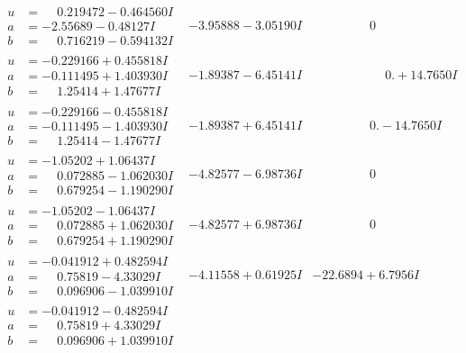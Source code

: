 \documentclass[1p]{elsarticle_modified}
\theoremstyle{definition}
\begin{document}
$$\begin{array}{c|c|c}
\begin{aligned}
u &= \phantom{-}0.219472 - 0.464560 I \\
a &= -2.55689 - 0.48127 I \\
b &= \phantom{-}0.716219 - 0.594132 I\end{aligned}
 & -3.95888 - 3.05190 I & \phantom{-0.000000 } 0 \\ \hline\begin{aligned}
u &= -0.229166 + 0.455818 I \\
a &= -0.111495 + 1.403930 I \\
b &= \phantom{-}1.25414 + 1.47677 I\end{aligned}
 & -1.89387 - 6.45141 I & \phantom{-0.000000 -}0. + 14.7650 I \\ \hline\begin{aligned}
u &= -0.229166 - 0.455818 I \\
a &= -0.111495 - 1.403930 I \\
b &= \phantom{-}1.25414 - 1.47677 I\end{aligned}
 & -1.89387 + 6.45141 I & \phantom{-0.000000 } 0. - 14.7650 I \\ \hline\begin{aligned}
u &= -1.05202 + 1.06437 I \\
a &= \phantom{-}0.072885 - 1.062030 I \\
b &= \phantom{-}0.679254 - 1.190290 I\end{aligned}
 & -4.82577 - 6.98736 I & \phantom{-0.000000 } 0 \\ \hline\begin{aligned}
u &= -1.05202 - 1.06437 I \\
a &= \phantom{-}0.072885 + 1.062030 I \\
b &= \phantom{-}0.679254 + 1.190290 I\end{aligned}
 & -4.82577 + 6.98736 I & \phantom{-0.000000 } 0 \\ \hline\begin{aligned}
u &= -0.041912 + 0.482594 I \\
a &= \phantom{-}0.75819 - 4.33029 I \\
b &= \phantom{-}0.096906 - 1.039910 I\end{aligned}
 & -4.11558 + 0.61925 I & -22.6894 + 6.7956 I \\ \hline\begin{aligned}
u &= -0.041912 - 0.482594 I \\
a &= \phantom{-}0.75819 + 4.33029 I \\
b &= \phantom{-}0.096906 + 1.039910 I\end{aligned}

\end{array}$$
\end{document}
